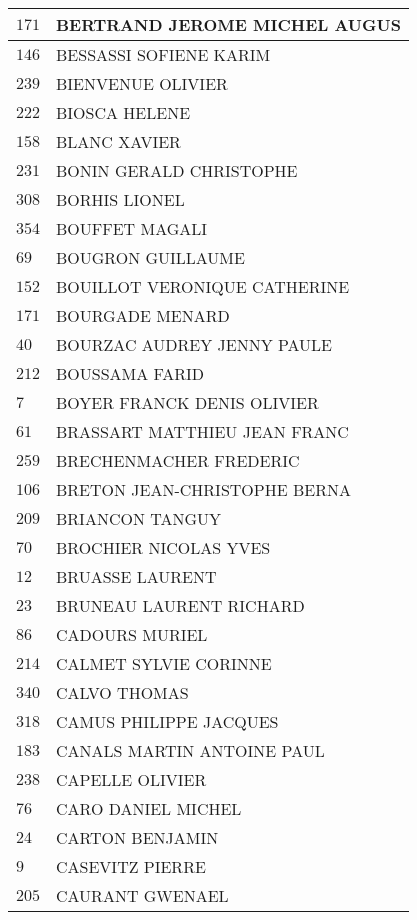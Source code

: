 \begin{xltabular}{\linewidth}{|l|X|}
    \hline
    $171$ & BERTRAND JEROME MICHEL AUGUS \\
    \hline
    $146$ & BESSASSI SOFIENE KARIM \\
    \hline
    $239$ & BIENVENUE OLIVIER \\
    \hline
    $222$ & BIOSCA HELENE \\
    \hline
    $158$ & BLANC XAVIER \\
    \hline
    $231$ & BONIN GERALD CHRISTOPHE \\
    \hline
    $308$ & BORHIS LIONEL \\
    \hline
    $354$ & BOUFFET MAGALI \\
    \hline
    $69$ & BOUGRON GUILLAUME \\
    \hline
    $152$ & BOUILLOT VERONIQUE CATHERINE \\
    \hline
    $171$ & BOURGADE MENARD \\
    \hline
    $40$ & BOURZAC AUDREY JENNY PAULE \\
    \hline
    $212$ & BOUSSAMA FARID \\
    \hline
    $7$ & BOYER FRANCK DENIS OLIVIER \\
    \hline
    $61$ & BRASSART MATTHIEU JEAN FRANC \\
    \hline
    $259$ & BRECHENMACHER FREDERIC \\
    \hline
    $106$ & BRETON JEAN-CHRISTOPHE BERNA \\
    \hline
    $209$ & BRIANCON TANGUY \\
    \hline
    $70$ & BROCHIER NICOLAS YVES \\
    \hline
    $12$ & BRUASSE LAURENT \\
    \hline
    $23$ & BRUNEAU LAURENT RICHARD \\
    \hline
    $86$ & CADOURS MURIEL \\
    \hline
    $214$ & CALMET SYLVIE CORINNE \\
    \hline
    $340$ & CALVO THOMAS \\
    \hline
    $318$ & CAMUS PHILIPPE JACQUES \\
    \hline
    $183$ & CANALS MARTIN ANTOINE PAUL \\
    \hline
    $238$ & CAPELLE OLIVIER \\
    \hline
    $76$ & CARO DANIEL MICHEL \\
    \hline
    $24$ & CARTON BENJAMIN \\
    \hline
    $9$ & CASEVITZ PIERRE \\
    \hline
    $205$ & CAURANT GWENAEL \\

\end{xltabular}
